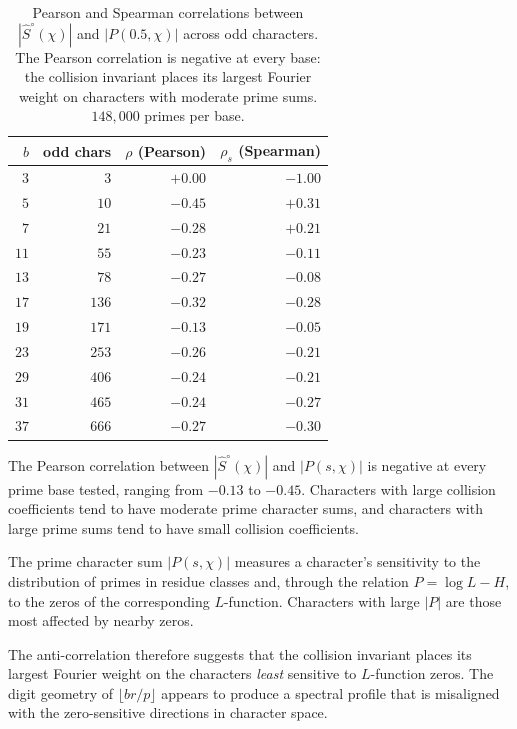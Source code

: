\documentclass[12pt]{amsart}
\theoremstyle{definition}
\theoremstyle{remark}
\begin{document}
\begin{table}[h]
\centering
\begin{tabular}{rrrr}
\toprule
$b$ & odd chars & $\rho$ (Pearson) & $\rho_s$ (Spearman) \\
\midrule
$3$ & $3$ & $+0.00$ & $-1.00$ \\
$5$ & $10$ & $-0.45$ & $+0.31$ \\
$7$ & $21$ & $-0.28$ & $+0.21$ \\
$11$ & $55$ & $-0.23$ & $-0.11$ \\
$13$ & $78$ & $-0.27$ & $-0.08$ \\
$17$ & $136$ & $-0.32$ & $-0.28$ \\
$19$ & $171$ & $-0.13$ & $-0.05$ \\
$23$ & $253$ & $-0.26$ & $-0.21$ \\
$29$ & $406$ & $-0.24$ & $-0.21$ \\
$31$ & $465$ & $-0.24$ & $-0.27$ \\
$37$ & $666$ & $-0.27$ & $-0.30$ \\
\bottomrule
\end{tabular}
\caption{Pearson and Spearman correlations between
$|\hat{S}^{\circ}(\chi)|$ and $|P(0.5, \chi)|$ across
odd characters. The Pearson correlation is negative at
every base: the collision invariant places its largest
Fourier weight on characters with moderate prime sums.
$148{,}000$ primes per base.}
\label{tab:anticorr}
\end{table}

The Pearson correlation between
$|\hat{S}^{\circ}(\chi)|$ and $|P(s, \chi)|$ is
negative at every prime base tested, ranging from
$-0.13$ to $-0.45$. Characters with large collision
coefficients tend to have moderate prime character
sums, and characters with large prime sums tend to
have small collision coefficients.

The prime character sum $|P(s, \chi)|$ measures a
character's sensitivity to the distribution of
primes in residue classes and, through the relation
$P = \log L - H$, to the zeros of the corresponding
$L$-function. Characters with large $|P|$ are those
most affected by nearby zeros.

The anti-correlation therefore suggests that the collision
invariant places its largest Fourier weight on the
characters \emph{least} sensitive to $L$-function
zeros. The digit geometry of $\lfloor br/p \rfloor$
appears to produce a spectral profile that is
misaligned with the zero-sensitive directions in
character space.
\end{document}
